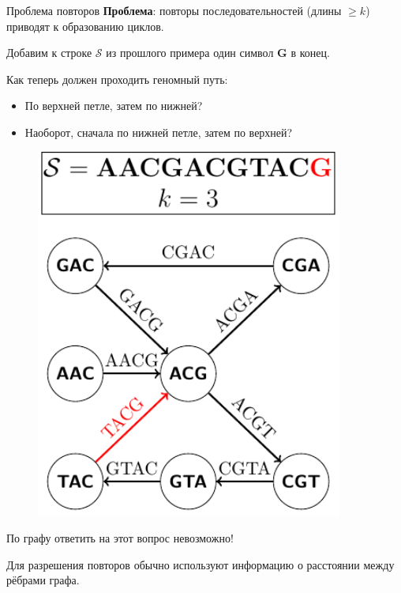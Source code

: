 \documentclass[unicode, notheorems]{beamer}
\begin{document}
\begin{frame}{Проблема повторов}
	\textbf{Проблема}: повторы последовательностей (длины $\ge k$) приводят к образованию циклов.
\begin{minipage}{0.6\textwidth}
	
	\bigskip
	Добавим к строке $\mathcal{S}$ из прошлого примера один символ \textbf{\color{red} G} в конец.
	
	\medskip
	Как теперь должен проходить геномный путь: \begin{itemize}
		\item По верхней петле, затем по нижней?
		\item Наоборот, сначала по нижней петле, затем по верхней?
	\end{itemize}
\end{minipage}%
\begin{minipage}{0.4\textwidth}
	\begin{figure}
		\centering
		\includegraphics[width=0.9\textwidth]{fig/dBg_repeat}
	\end{figure}
\end{minipage}

\bigskip
По графу ответить на этот вопрос невозможно!

\medskip
Для разрешения повторов обычно используют информацию о расстоянии между рёбрами графа.
\end{frame}
\end{document}
